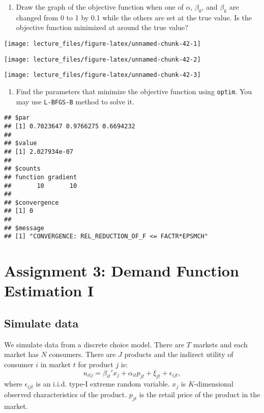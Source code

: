 \documentclass[
]{book}
\providecommand{\tightlist}{%
  \setlength{\itemsep}{0pt}\setlength{\parskip}{0pt}}
\begin{document}
\begin{enumerate}
\def\labelenumi{\arabic{enumi}.}
\setcounter{enumi}{7}
\tightlist
\item
  Draw the graph of the objective function when one of \(\alpha\), \(\beta_0\), and \(\beta_k\) are changed from 0 to 1 by 0.1 while the others are set at the true value. Is the objective function minimized at around the true value?
\end{enumerate}

\begin{center}\texttt{[image: lecture\_files/figure-latex/unnamed-chunk-42-1]} \end{center}

\begin{center}\texttt{[image: lecture\_files/figure-latex/unnamed-chunk-42-2]} \end{center}

\begin{center}\texttt{[image: lecture\_files/figure-latex/unnamed-chunk-42-3]} \end{center}

\begin{enumerate}
\def\labelenumi{\arabic{enumi}.}
\setcounter{enumi}{8}
\tightlist
\item
  Find the parameters that minimize the objective function using \texttt{optim}. You may use \texttt{L-BFGS-B} method to solve it.
\end{enumerate}

\begin{verbatim}
## $par
## [1] 0.7023647 0.9766275 0.6694232
## 
## $value
## [1] 2.027934e-07
## 
## $counts
## function gradient 
##       10       10 
## 
## $convergence
## [1] 0
## 
## $message
## [1] "CONVERGENCE: REL_REDUCTION_OF_F <= FACTR*EPSMCH"
\end{verbatim}

\hypertarget{assignment3}{%
\chapter{Assignment 3: Demand Function Estimation I}\label{assignment3}}

\hypertarget{simulate-data-2}{%
\section{Simulate data}\label{simulate-data-2}}

We simulate data from a discrete choice model. There are \(T\) markets and each market has \(N\) consumers. There are \(J\) products and the indirect utility of consumer \(i\) in market \(t\) for product \(j\) is:
\[
u_{itj} = \beta_{it}' x_j + \alpha_{it} p_{jt} + \xi_{jt} + \epsilon_{ijt},
\]
where \(\epsilon_{ijt}\) is an i.i.d. type-I extreme random variable. \(x_j\) is \(K\)-dimensional observed characteristics of the product. \(p_{jt}\) is the retail price of the product in the market.
\end{document}
